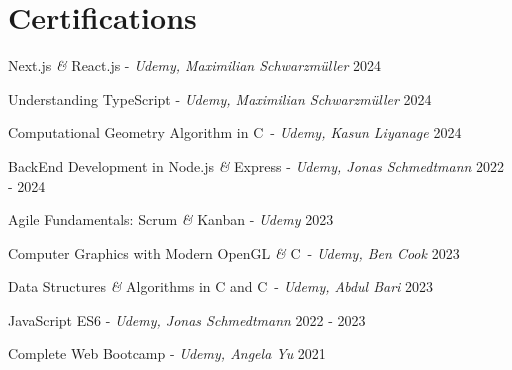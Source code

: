 \documentclass[a4paper,10pt]{article}
\begin{document}
\section{Certifications}

\honorsawards
{Next.js \textit{\&} React.js - \textit{Udemy, Maximilian Schwarzmüller}}
{2024}

\honorsawards
{Understanding TypeScript - \textit{Udemy, Maximilian Schwarzmüller}}
{2024}

\honorsawards
{Computational Geometry Algorithm in C\plusplus\ - \textit{Udemy, Kasun Liyanage}}
{2024}

\honorsawards
{BackEnd Development in Node.js \textit{\&} Express - \textit{Udemy, Jonas Schmedtmann}}
{2022 - 2024}

\honorsawards
{Agile Fundamentals: Scrum \textit{\&} Kanban - \textit{Udemy}}
{2023}

\honorsawards
{Computer Graphics with Modern OpenGL \textit{\&} C\plusplus\ - \textit{Udemy, Ben Cook}}
{2023}

\honorsawards
{Data Structures \textit{\&} Algorithms in C and C\plusplus\ - \textit{Udemy, Abdul Bari}}
{2023}

\honorsawards
{JavaScript ES6 - \textit{Udemy, Jonas Schmedtmann}}
{2022 - 2023}

\honorsawards
{Complete Web Bootcamp - \textit{Udemy, Angela Yu}}
{2021}
\end{document}
